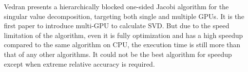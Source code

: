 Vedran\cite{14arxivjacobi} presents a hierarchically blocked one-sided Jacobi algorithm for the singular value decomposition, targeting both single and multiple GPUs.
It is the first paper to introduce multi-GPU to calculate SVD.
But due to the speed limitation of the algorithm, even it is fully optimization and has a high speedup compared to the same algorithm on CPU, the execution time is still more than that of any other algorithms.
It could not be the best algorithm for speedup except when extreme relative accuracy is required.

